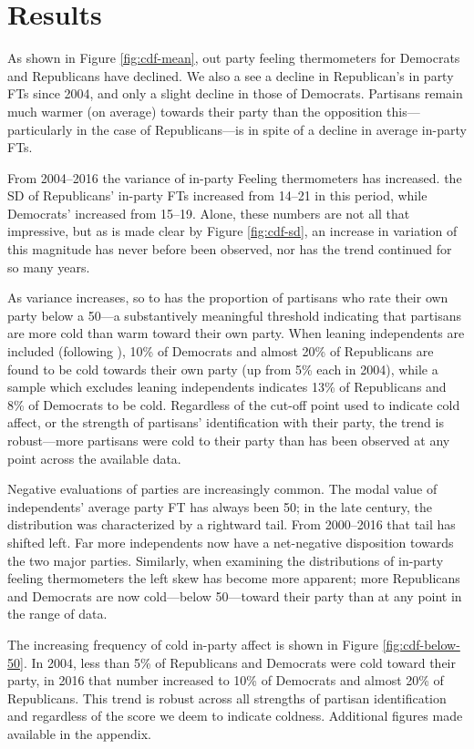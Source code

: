 \documentclass[12pt]{paper}
\begin{document}
\section{Results}

As shown in Figure \ref{fig:cdf-mean}, out party feeling thermometers for Democrats and Republicans have declined. We also a see a decline in Republican's in party FTs since 2004, and only a slight decline in those of Democrats. Partisans remain much warmer (on average) towards their party than the opposition this---particularly in the case of Republicans---is in spite of a decline in average in-party FTs.

From 2004--2016 the variance of in-party Feeling thermometers has increased. the SD of Republicans' in-party FTs increased from 14--21 in this period, while Democrats' increased from 15--19. Alone, these numbers are not all that impressive, but as is made clear by Figure \ref{fig:cdf-sd}, an increase in variation of this magnitude has never before been observed, nor has the trend continued for so many years.

As variance increases, so to has the proportion of partisans who rate their own party below a 50---a substantively meaningful threshold indicating that partisans are more cold than warm toward their own party. When leaning independents are included (following \citep{klar2016independent}), 10\% of Democrats and almost 20\% of Republicans are found to be cold towards their own party (up from 5\% each in 2004), while a sample which excludes leaning independents indicates 13\% of Republicans and 8\% of Democrats to be cold. Regardless of the cut-off point used to indicate cold affect, or the strength of partisans' identification with their party, the trend is robust---more partisans were cold to their party than has been observed at any point across the available data.

Negative evaluations of parties are increasingly common. The modal value of independents' average party FT has always been 50; in the late  century, the distribution was characterized by a rightward tail. From 2000--2016 that tail has shifted left. Far more independents now have a net-negative disposition towards the two major parties. Similarly, when examining the distributions of in-party feeling thermometers the left skew has become more apparent; more Republicans and Democrats are now cold---below 50---toward their party than at any point in the range of data.


The increasing frequency of cold in-party affect is shown in Figure \ref{fig:cdf-below-50}. In 2004, less than 5\% of Republicans and Democrats were cold toward their party, in 2016 that number increased to 10\% of Democrats and almost 20\% of Republicans. This trend is robust across all strengths of partisan identification and regardless of the score we deem to indicate coldness. Additional figures made available in the appendix.
\end{document}
